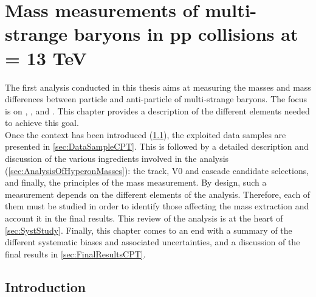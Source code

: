 \chapter{Mass measurements of multi-strange baryons in pp collisions at \sqrtS = 13 TeV}
\label{chap:CPTAnalysis}

The first analysis conducted in this thesis aims at measuring the masses and mass differences between particle and anti-particle of multi-strange baryons. The focus is on \rmXiM, \rmAxiP, \rmOmegaM and \rmAomegaP. This chapter provides a description of the different elements needed to achieve this goal. \\

Once the context has been introduced (\Sec\ref{sec:IntroductionCPT}), the exploited data samples are presented in \Sec\ref{sec:DataSampleCPT}. This is followed by a detailed description and discussion of the various ingredients involved in the analysis (\Sec\ref{sec:AnalysisOfHyperonMasses}): the track, V0 and cascade candidate selections, and finally, the principles of the mass measurement. By design, such a measurement depends on the different elements of the analysis. Therefore, each of them must be studied in order to identify those affecting the mass extraction and account it in the final results. This review of the analysis is at the heart of \Sec\ref{sec:SystStudy}. Finally, this chapter comes to an end with a summary of the different systematic biases and associated uncertainties, and a discussion of the final results in \Sec\ref{sec:FinalResultsCPT}. 

\section{Introduction}
\label{sec:IntroductionCPT}

